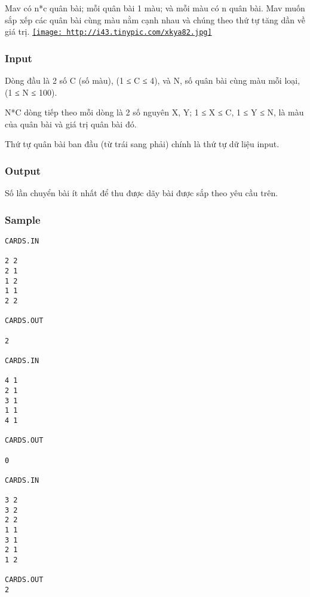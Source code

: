 



   Mav có n*c quân bài; mỗi quân bài 1 màu; và mỗi màu có n quân bài. Mav  muốn sắp xếp các quân bài cùng màu nằm cạnh nhau và chúng theo thứ tự  tăng dần về giá trị.  \href{http://tinypic.com}{
\texttt{[image: http://i43.tinypic.com/xkya82.jpg]}}

\subsubsection{   Input  }

   Dòng đầu là 2 số C (số màu), (1 ≤ C ≤ 4), và N, số quân bài cùng màu mỗi loại, (1 ≤ N ≤ 100).  

   N*C dòng tiếp theo mỗi dòng là 2 số nguyên X, Y; 1 ≤ X ≤ C, 1 ≤ Y ≤ N,  là màu của quân bài và giá trị quân bài đó.  

   Thứ tự quân bài ban đầu (từ trái sang phải) chính là thứ tự dữ liệu input.  



\subsubsection{   Output  }



   Số lần chuyển bài ít nhất để thu được dãy bài được sắp theo yêu cầu trên.  



\subsubsection{   Sample  }
\begin{verbatim}
CARDS.IN

2 2
2 1
1 2
1 1
2 2

CARDS.OUT

2
 
CARDS.IN

4 1
2 1
3 1
1 1
4 1

CARDS.OUT

0
 
CARDS.IN

3 2
3 2
2 2
1 1
3 1
2 1
1 2

CARDS.OUT
2
\end{verbatim}